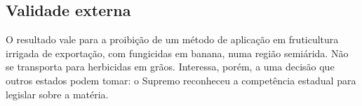 \subsection{Validade externa}

O resultado vale para a proibição de um método de aplicação em fruticultura
irrigada de exportação, com fungicidas em banana, numa região semiárida. Não se
transporta para herbicidas em grãos. Interessa, porém, a uma decisão que outros
estados podem tomar: o Supremo reconheceu a competência estadual para legislar
sobre a matéria.
